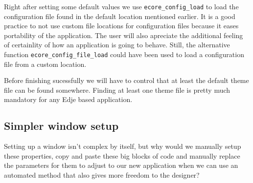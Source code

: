 \documentclass[12pt,a4paper,english]{book}
\begin{document}
Right after setting some default values we use \texttt{ecore{\_}config{\_}load} to load
the configuration file found in the default location mentioned earlier. It is
a good practice to not use custom file locations for configuration files
because it eases portability of the application. The user will also apreciate
the additional feeling of certainlity of how an application is going to behave.
Still, the alternative function \texttt{ecore{\_}config{\_}file{\_}load} could have been used
to load a configuration file from a custom location.

Before finishing sucessfully we will have to control that at least the default
theme file can be found somewhere. Finding at least one theme file is pretty
much mandatory for any Edje based application.



\hypertarget{simpler-window-setup}{}
\subsection{Simpler window setup}
\label{simpler-window-setup}

Setting up a window isn't complex by itself, but why would we manually setup
these properties, copy and paste these big blocks of code and manually
replace the parameters for them to adjust to our new application when we can
use an automated method that also gives more freedom to the designer?
\end{document}

